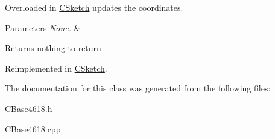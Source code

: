 Overloaded in \hyperlink{class_c_sketch}{C\+Sketch} updates the coordinates. 


\begin{DoxyParams}{Parameters}
{\em None.} & \\
\hline
\end{DoxyParams}
\begin{DoxyReturn}{Returns}
nothing to return 
\end{DoxyReturn}


Reimplemented in \hyperlink{class_c_sketch_a8b6185fa49d7f9d8909dcffde3cdec3d}{C\+Sketch}.



The documentation for this class was generated from the following files\+:\begin{DoxyCompactItemize}
\item 
C\+Base4618.\+h\item 
C\+Base4618.\+cpp\end{DoxyCompactItemize}
